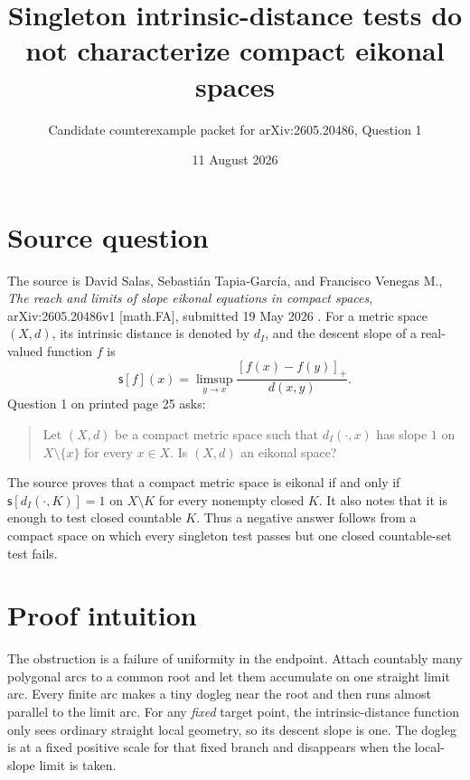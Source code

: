 \documentclass[11pt]{article}
\title{Singleton intrinsic-distance tests do not characterize compact eikonal spaces}
\author{Candidate counterexample packet for arXiv:2605.20486, Question 1}
\date{11 August 2026}
\newcommand{\slope}{\mathsf{s}}
\begin{document}
\maketitle

\begin{center}
\end{center}

\section{Source question}

The source is David Salas, Sebasti\'an Tapia-Garc\'ia, and Francisco Venegas M.,
\emph{The reach and limits of slope eikonal equations in compact spaces},
arXiv:2605.20486v1 [math.FA], submitted 19 May 2026 \cite{source}.
For a metric space $(X,d)$, its intrinsic distance is denoted by $d_I$, and the
descent slope of a real-valued function $f$ is
\[
  \slope[f](x)=\limsup_{y\to x}
  \frac{[f(x)-f(y)]_+}{d(x,y)}.
\]
Question 1 on printed page 25 asks:

\begin{quote}
Let $(X,d)$ be a compact metric space such that $d_I(\cdot,x)$ has slope $1$
on $X\setminus\{x\}$ for every $x\in X$. Is $(X,d)$ an eikonal space?
\end{quote}

The source proves that a compact metric space is eikonal if and only if
$\slope[d_I(\cdot,K)]=1$ on $X\setminus K$ for every nonempty closed $K$.
It also notes that it is enough to test closed countable $K$. Thus a negative
answer follows from a compact space on which every singleton test passes but
one closed countable-set test fails.

\section{Proof intuition}

The obstruction is a failure of uniformity in the endpoint. Attach countably
many polygonal arcs to a common root and let them accumulate on one straight
limit arc. Every finite arc makes a tiny dogleg near the root and then runs
almost parallel to the limit arc. For any \emph{fixed} target point, the
intrinsic-distance function only sees ordinary straight local geometry, so
its descent slope is one. The dogleg is at a fixed positive scale for that
fixed branch and disappears when the local-slope limit is taken.
\end{document}
